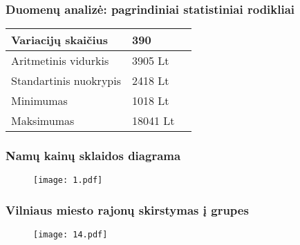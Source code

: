 \documentclass[utf8,hyperref={unicode}]{beamer}
\theoremstyle{change}\newtheorem{teorema}{Teiginys}
\theoremstyle{change}\newtheorem{salyga}{}
\begin{document}
\begin{frame} 
    \frametitle{Duomenų analizė: pagrindiniai statistiniai rodikliai} 
 	 \begin{table}[H]
             \begin{center}
              \begin{tabular}{| l | l | l |}
    \hline
    Variacijų skaičius & 390 \\ \hline
    Aritmetinis vidurkis & 3905 Lt \\ \hline
    Standartinis nuokrypis & 2418 Lt \\ \hline
    Minimumas & 1018 Lt\\ \hline
    Maksimumas & 18041 Lt\\
    \hline
        \end{tabular}
        \end{center}
        \end{table}
\end{frame}

\begin{frame}
    \frametitle{Namų kainų sklaidos diagrama} 
    \begin{figure}[H]
  \centering
    \texttt{[image: 1.pdf]}
\end{figure}
\end{frame}

\begin{frame}
    \frametitle{Vilniaus miesto rajonų skirstymas į grupes}
    \begin{figure}[H]
  \centering
    \texttt{[image: 14.pdf]} 
\end{figure}
\end{frame}
\end{document}
